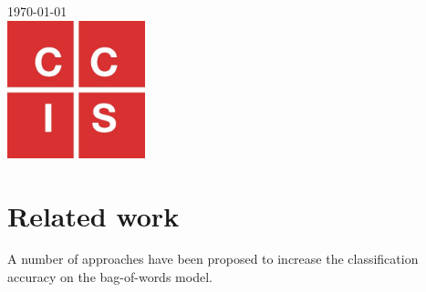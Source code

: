 \begin{titlepage}


{\large \today}\\[2cm] %


\includegraphics[width=4cm, height=4cm]{logo.jpg}\\[1cm] %
 


\end{titlepage}





\chapter{Related work}

A number of approaches have been proposed to increase the classification accuracy on the bag-of-words model.

